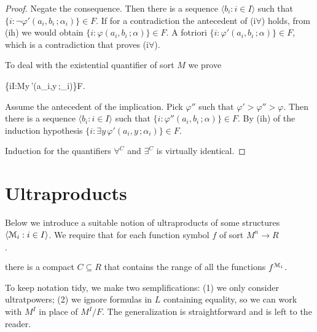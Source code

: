 \documentclass[12pt,letterpaper,oneside,reqno]{amsart}
\newcommand{\mylabel}[1]{{#1}\hfill}
\renewenvironment{itemize}
  {\begin{list}{$\cdot$}{%
   \setlength{\parskip}{0mm}
   \setlength{\topsep}{.2\baselineskip}
   \setlength{\rightmargin}{0mm}
   \setlength{\listparindent}{0mm}
   \setlength{\itemindent}{0mm}
   \setlength{\labelwidth}{3ex}
   \setlength{\itemsep}{.2\baselineskip}
   \setlength{\parsep}{.2\baselineskip}
   \setlength{\partopsep}{0mm}
   \setlength{\labelsep}{1ex}
   \setlength{\leftmargin}{\labelwidth+\labelsep}
   \let\makelabel\mylabel}}{%
   \end{list}}
\theoremstyle{plain}
\theoremstyle{remark}
\begin{document}
\begin{proof}
  Negate the consequence.
  Then there is a sequence $\langle b_i:i\in I\rangle$ such that $\big\{ i:\neg\varphi'(a_i,b_i\,;\alpha_i)\big\}\in F$. 
  If for a contradiction the antecedent of (\textsf{i}$\forall$) holds, from (\textsf{ih}) we would obtain $\big\{i:\varphi(a_i,b_i\,; \alpha)\big\}\in F$.
  A fotriori  $\big\{i:\varphi'(a_i,b_i\,; \alpha)\big\}\in F$, which is a contradiction that proves (\textsf{i}$\forall$).

  To deal with the existential quantifier of sort $M$ we prove 

  {\Rightarrow}
  {\big\{i\in I:{\EuScript M}\models\exists y\,\varphi'(a_i,y\,;\alpha_i)\big\}\in F}.

  Assume the antecedent of the implication.
  Pick $\varphi''$ such that $\varphi'>\varphi''>\varphi$.
  Then there is a sequence $\langle b_i:i\in I\rangle$ such that $\big\{ i:\varphi''(a_i,b_i\,;\alpha)\big\}\in F$.
  By (\textsf{ih}) of the induction hypothesis $\big\{ i:\exists y\,\varphi'(a_i,y\,;\alpha_i)\big\}\in F$.
  
  Induction for the quantifiers $\forall^C$ and  $\exists^C$ is virtually identical.
\end{proof}

\section{Ultraproducts}\label{ultrapws}

\def\ceq#1#2#3{\parbox[t]{30ex}{$\displaystyle #1$}\parbox{5ex}{\hfil $#2$}{$\displaystyle #3$}}

Below we introduce a suitable notion of ultraproducts of some structures $\langle{\EuScript M}_i:i\in I\rangle$.
We require that for each function symbol $f$ of sort $M^n\to R$ 
\begin{itemize}
  \item[\#] there is a compact $C\subseteq R$ that contains the range of all the functions $f^{{\EuScript M}_i}$.
\end{itemize}

To keep notation tidy, we make two semplifications:
(1) we only consider ultratpowers; 
(2) we ignore formulas in $L$ containing equality, so we can work with $M^I$ in place of $M^I/F$.
The generalization is straightforward and is left to the reader.
\end{document}
